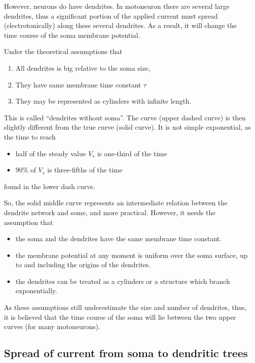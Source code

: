 
However, neurons do have dendrites. In motoneuron there are several
large dendrites, thus a significant portion of the applied current
must spread (electrotonically) along these several dendrites. As a
result, it will change the time course of the soma membrane potential.

Under the theoretical assumptions that
\begin{enumerate}
\item All dendrites is big relative to the soma size,
\item They have same membrane time constant $\tau$
\item They may be represented as cylinders with infinite length. 
\end{enumerate}
This is called ``dendrites without soma''. The curve (upper dashed
curve) is then slightly different from the true curve (solid
curve). It is not simple exponential, as the time to reach 
\begin{itemize}
\item half of the steady value $V_s$ is one-third of the time
\item 90\% of $V_s$ is three-fifths of the time
\end{itemize}
found in the lower dash curve.


So, the solid middle curve represents an intermediate relation between
the dendrite network and some, and more practical. However, it needs
the assumption that 
\begin{itemize}
\item the soma and the dendrites have the same membrane time
  constant. 
\item the membrane potential at any moment is uniform over the soma
  surface, up to and including the origins of the dendrites. 
\item the dendrites can be treated as a cylinders or a structure which
  branch exponentially.
\end{itemize}
As these assumptions still underestimate the size and number of
dendrites, thus, it is believed that the time course of the soma will
lie between the two upper curves (for many motoneurons).


\subsection{Spread of current from soma to dendritic trees}
\label{sec:spread-current-from}

